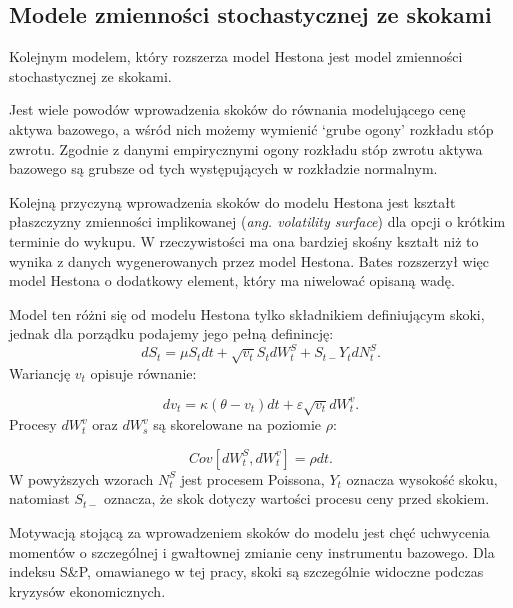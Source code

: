 \documentclass{pracamgr}
\begin{document}
\subsection{Modele zmienności stochastycznej ze skokami} %
\label{sec:modele_zmienno_ci_stochastycznej_ze_skokami}
 
Kolejnym modelem, który rozszerza model Hestona jest model zmienności stochastycznej ze skokami.

Jest wiele powodów wprowadzenia skoków do równania modelującego cenę aktywa bazowego, a wśród nich 
możemy wymienić `grube ogony' rozkładu stóp zwrotu. Zgodnie z danymi empirycznymi ogony rozkładu stóp 
zwrotu aktywa bazowego są grubsze od tych występujących w rozkładzie normalnym.

Kolejną przyczyną wprowadzenia skoków do modelu Hestona jest kształt płaszczyzny zmienności implikowanej
(\textit{ang. volatility surface}) dla opcji o krótkim terminie do wykupu. W rzeczywistości ma ona 
bardziej skośny kształt niż to wynika z danych wygenerowanych przez model Hestona. 
Bates \cite{Bates} rozszerzył więc model Hestona o dodatkowy element, który ma niwelować opisaną wadę.

Model ten różni się od modelu Hestona tylko składnikiem definiującym skoki, jednak dla
porządku podajemy jego pełną definincję:
\begin{equation}
dS_t  = \mu S_t dt + \sqrt{v_t} S_t dW^S_t + S_{t-} Y_t dN_t^S.
\end{equation}
Wariancję $v_t$ opisuje równanie: 

\begin{equation}
dv_t  = \kappa (\theta - v_t)dt + \varepsilon \sqrt{v_t} dW_t^v.
\end{equation}
Procesy $dW_t^v$ oraz $dW_s^v$ są skorelowane na poziomie $\rho$:

\begin{equation}
Cov[dW^S_t, dW^v_t] = \rho dt.
\end{equation}
W powyższych wzorach $N_t^S$ jest procesem Poissona, $Y_t$ oznacza wysokość skoku, 
natomiast $S_{t-}$ oznacza, że skok dotyczy wartości procesu ceny przed skokiem.

Motywacją stojącą za wprowadzeniem skoków do modelu jest chęć uchwycenia momentów o 
szczególnej i gwałtownej zmianie ceny instrumentu bazowego. Dla indeksu S\&P, omawianego w tej pracy,
skoki są szczególnie widoczne podczas kryzysów ekonomicznych. 



 
\end{document}

